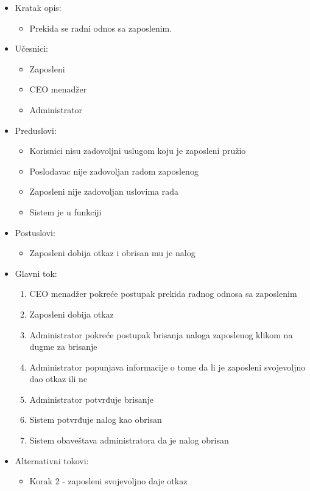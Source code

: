 \documentclass[a4paper]{article}
\begin{document}
\begin{itemize}
    \item Kratak opis: 
    \begin{itemize}
        \item Prekida se radni odnos sa zaposlenim.
    \end{itemize}
    \item Učesnici:
        \begin{itemize}
        \item Zaposleni
        \item CEO menadžer
        \item Administrator
    \end{itemize}
    \item Preduslovi:
        \begin{itemize}
            \item Korisnici nisu zadovoljni uslugom koju je zaposleni pružio
            \item Poslodavac nije zadovoljan radom zaposlenog
            \item Zaposleni nije zadovoljan uslovima rada
            \item Sistem je u funkciji
        \end{itemize}
    \item Postuslovi:
        \begin{itemize}
            \item Zaposleni dobija otkaz i obrisan mu je nalog
        \end{itemize}
    \item Glavni tok:
        \begin{enumerate}
            \item CEO menadžer pokreće postupak prekida radnog odnosa sa zaposlenim
            \item Zaposleni dobija otkaz
            \item Administrator pokreće postupak brisanja naloga zaposlenog klikom na dugme za brisanje
            \item Administrator popunjava informacije o tome da li je zaposleni svojevoljno dao otkaz ili ne
            \item Administrator potvrđuje brisanje
            \item Sistem potvrđuje nalog kao obrisan
            \item Sistem obaveštava administratora da je nalog obrisan
        \end{enumerate}
    \item Alternativni tokovi:
        \begin{itemize}
            \item Korak 2 - zaposleni svojevoljno daje otkaz
        \end{itemize}
\end{itemize}
\end{document}

